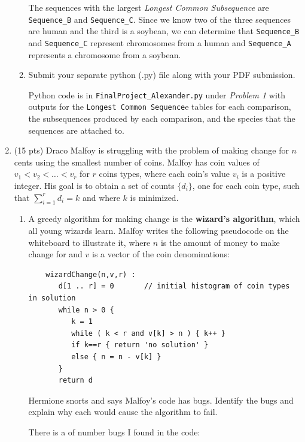 \documentclass[12pt]{article}
\begin{document}
\begin{enumerate}
\begin{enumerate}
{		The sequences with the largest \emph{Longest Common Subsequence} are \texttt{Sequence\_B} and \texttt{Sequence\_C}. Since we know two of the three sequences are human and the third is a soybean, we can determine that \texttt{Sequence\_B} and \texttt{Sequence\_C} represent chromosomes from a human and \texttt{Sequence\_A} represents a chromosome from a soybean.


	}\newpage

    \item Submit your separate python (.py) file along with your PDF submission.

	{\color{blue}
		Python code is in \texttt{FinalProject\_Alexander.py} under \emph{Problem 1} with outputs for the \texttt{Longest Common Sequence}e tables for each comparison, the subsequences produced by each comparison, and the species that the sequences are attached to.
	}\newpage

\end{enumerate}

\item (15 pts) Draco Malfoy is struggling with the problem of making change for $n$ cents using the smallest number of coins. Malfoy has coin values of $v_{1}<v_{2}<\dots<v_{r}$ for $r$ coins types, where each coin's value $v_{i}$ is a positive integer. His goal is to obtain a set of counts $\{d_{i}\}$, one for each coin type, such that $\sum_{i=1}^{r}d_{i}=k$ and where $k$ is minimized.
	\begin{enumerate}
	\item A greedy algorithm for making change is the \textbf{wizard's algorithm}, which all young wizards learn. Malfoy writes the following pseudocode on the whiteboard to illustrate it, where $n$ is the amount of money to make change for and $v$ is a vector of the coin denominations:
	\begin{small}
	\begin{verbatim}
	wizardChange(n,v,r) :
	   d[1 .. r] = 0       // initial histogram of coin types in solution
	   while n > 0 {
	      k = 1
	      while ( k < r and v[k] > n ) { k++ }
	      if k==r { return 'no solution' }
	      else { n = n - v[k] }
	   }
	   return d
	\end{verbatim}
	\end{small}
	Hermione snorts and says Malfoy's code has bugs. Identify the bugs and explain why each would cause the algorithm to fail.
	
	{\color{blue}
		There is a of number bugs I found in the code:
		\begin{enumerate}


\end{enumerate}}
\end{enumerate}
\end{enumerate}
\end{document}
